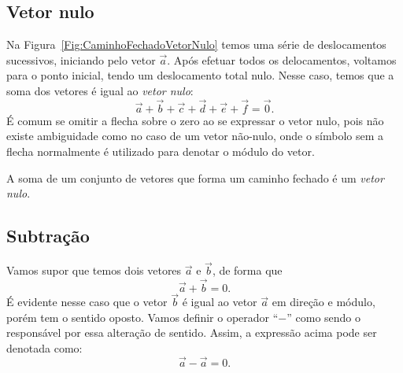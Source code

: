 \subsection{Vetor nulo}

Na Figura~\ref{Fig:CaminhoFechadoVetorNulo} temos uma série de deslocamentos sucessivos, iniciando pelo vetor $\vec{a}$. Após efetuar todos os delocamentos, voltamos para o ponto inicial, tendo um deslocamento total nulo. Nesse caso, temos que a soma dos vetores é igual ao \emph{vetor nulo}:
\begin{equation}
    \vec{a} + \vec{b} + \vec{c} + \vec{d} + \vec{e} + \vec{f} = \vec{0}.
\end{equation}
%
É comum se omitir a flecha sobre o zero ao se expressar o vetor nulo, pois não existe ambiguidade como no caso de um vetor não-nulo, onde o símbolo sem a flecha normalmente é utilizado para denotar o módulo do vetor.

\begin{marginfigure}
\centering
{}
\caption{A soma de um conjunto de vetores que forma um caminho fechado é um \emph{vetor nulo}.\label{Fig:CaminhoFechadoVetorNulo}}
\end{marginfigure}

\subsection{Subtração}

Vamos supor que temos dois vetores $\vec{a}$ e $\vec{b}$, de forma que
\begin{equation}
    \vec{a} + \vec{b} = 0.
\end{equation}
%
É evidente nesse caso que o vetor $\vec{b}$ é igual ao vetor $\vec{a}$ em direção e módulo, porém tem o sentido oposto. Vamos definir o operador ``$-$'' como sendo o responsável por essa alteração de sentido. Assim, a expressão acima pode ser denotada como:
\begin{equation}
    \vec{a} - \vec{a} = 0.
\end{equation}

